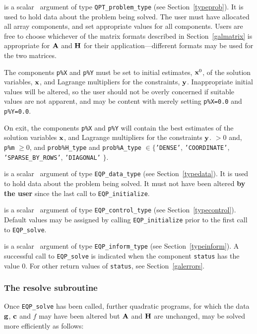 \documentclass{galahad}
\newcommand{\packagename}{EQP}
\begin{document}
\vspace*{-3mm}
\begin{description}
 is a scalar \intentinout\ argument of type 
{\tt QPT\_problem\_type}
(see Section~\ref{typeprob}). 
It is used to hold data about the problem being solved.
The user must have allocated all array components,
and set appropriate values for all components.
Users are free to choose whichever
of the matrix formats described in Section~\ref{galmatrix} 
is appropriate for ${\mathbf{A}}$ and ${\mathbf{H}}$ for their application---different 
formats may be used for the two matrices.

The components {\tt p\%X} and {\tt p\%Y}
must be set to initial estimates, ${\mathbf{x}}^{0}$, of the solution variables, 
${\mathbf{x}}$, and Lagrange multipliers for the constraints, ${\mathbf{y}}$.
Inappropriate initial values will be altered, so the user should
not be overly concerned if suitable values are not apparent, and may be
content with merely setting {\tt p\%X=0.0} and {\tt p\%Y=0.0}.

On exit, the components {\tt p\%X} and {\tt p\%Y}
will contain the best estimates of the solution variables ${\mathbf{x}}$, and
Lagrange multipliers for the constraints ${\mathbf{y}}$.
 $> 0$ and, {\tt p\%m} $\geq 0$,
and {\tt prob\%H\_type} and {\tt prob\%A\_type} 
 $\in \{${\tt 'DENSE'}, {\tt 'COORDINATE'}, 
{\tt 'SPARSE\_BY\_ROWS'}, {\tt 'DIAGONAL'} $\}$. 

 is a scalar \intentinout\ argument of type 
{\tt \packagename\_data\_type}
(see Section~\ref{typedata}). It is used to hold data about the problem being 
solved. It must not have been altered {\bf by the user} since the last call to 
{\tt \packagename\_initialize}.

 is a scalar \intentinout\ argument of type 
{\tt \packagename\_control\_type}
(see Section~\ref{typecontrol}). Default values may be assigned by calling 
{\tt \packagename\_initialize} prior to the first call to 
{\tt \packagename\_solve}.

 is a scalar \intentout\ argument of type 
{\tt \packagename\_inform\_type}
(see Section~\ref{typeinform}). A successful call to
{\tt \packagename\_solve}
is indicated when the  component {\tt status} has the value 0. 
For other return values of {\tt status}, see Section~\ref{galerrors}.

\end{description}


\subsubsection{The resolve subroutine}
Once {\tt \packagename\_solve} has been called, further 
quadratic programs, for which the data ${\mathbf{g}}$, ${\mathbf{c}}$ and $f$ may have 
been altered but ${\mathbf{A}}$ and ${\mathbf{H}}$ are unchanged, may be solved 
more efficiently as follows:
\vspace*{1mm}
\end{document}
